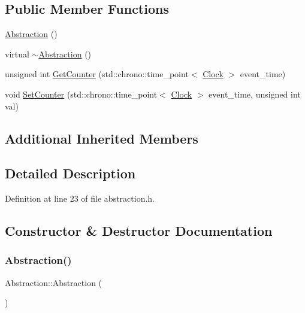 \subsection*{Public Member Functions}
\begin{DoxyCompactItemize}
\item 
\hyperlink{class_abstraction_af4bf8b0e2bfd07d50ffc28b98f35b2ee}{Abstraction} ()
\item 
virtual \hyperlink{class_abstraction_aaf7d34417ea08792cc2b9449f9bfdc8e}{$\sim$\+Abstraction} ()
\item 
unsigned int \hyperlink{class_abstraction_a2b5e781d95a843a67db307b431f419a7}{Get\+Counter} (std\+::chrono\+::time\+\_\+point$<$ \hyperlink{universe_8h_a0ef8d951d1ca5ab3cfaf7ab4c7a6fd80}{Clock} $>$ event\+\_\+time)
\item 
void \hyperlink{class_abstraction_a82cd32bf3de41f35ab76d80611fe6763}{Set\+Counter} (std\+::chrono\+::time\+\_\+point$<$ \hyperlink{universe_8h_a0ef8d951d1ca5ab3cfaf7ab4c7a6fd80}{Clock} $>$ event\+\_\+time, unsigned int val)
\end{DoxyCompactItemize}
\subsection*{Additional Inherited Members}


\subsection{Detailed Description}


Definition at line 23 of file abstraction.\+h.



\subsection{Constructor \& Destructor Documentation}
\mbox{\label{class_abstraction_af4bf8b0e2bfd07d50ffc28b98f35b2ee}} 
\subsubsection{\texorpdfstring{Abstraction()}{Abstraction()}}
{\footnotesize\ttfamily Abstraction\+::\+Abstraction (\begin{DoxyParamCaption}{ }\end{DoxyParamCaption})}

